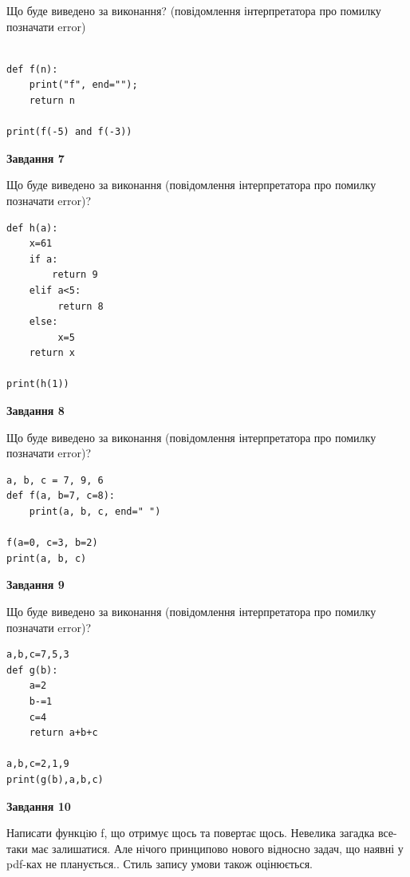 \documentclass[12pt, ukrainian]{article}
\begin{document}
{\begin {large}
Що буде виведено за виконання? (повідомлення інтерпретатора про помилку позначати error)\par
\begin{verbatim}

def f(n):
    print("f", end="");
    return n

print(f(-5) and f(-3))
\end{verbatim}

{\begin {center}\textbf{Завдання 7}\end {center}}

Що буде виведено за виконання (повідомлення інтерпретатора про помилку позначати error)?\par
\begin{verbatim}
def h(a):
    x=61
    if a: 
        return 9
    elif a<5:
         return 8
    else:
         x=5
    return x

print(h(1))
\end{verbatim}

{\begin {center}\textbf{Завдання 8}\end {center}}

Що буде виведено за виконання (повідомлення інтерпретатора про помилку позначати error)?\par
\begin{verbatim}
a, b, c = 7, 9, 6
def f(a, b=7, c=8):
    print(a, b, c, end=" ")

f(a=0, c=3, b=2)
print(a, b, c)
\end{verbatim}

{\begin {center}\textbf{Завдання 9}\end {center}}

Що буде виведено за виконання (повідомлення інтерпретатора про помилку позначати error)?\par
\begin{verbatim}
a,b,c=7,5,3
def g(b):
    a=2
    b-=1
    c=4
    return a+b+c

a,b,c=2,1,9
print(g(b),a,b,c)
\end{verbatim}

{\begin {center}\textbf{Завдання 10}\end {center}}


Написати функцiю f, що отримує щось та повертає щось. Невелика загадка все-таки має залишатися. Але нічого принципово нового відносно задач, що наявні у pdf-ках не планується.. Стиль запису умови також оцінюється.\par
\end {large}}
\newpage
\end{document}
